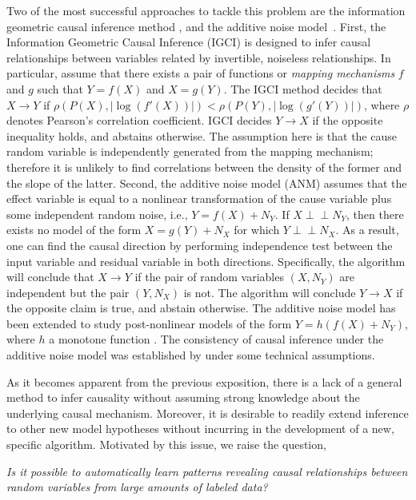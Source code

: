 \documentclass[twoside,11pt,a4paper]{article}
\newcommand\ci{\perp\!\!\!\perp}
\begin{document}
Two of the most successful approaches to tackle this problem are the
information geometric causal inference method \citep{Daniusis12,Janzing14}, and
the additive noise model~\citep{Hoyer09,Peters14:ANM}. 
%
First, the Information Geometric Causal Inference (IGCI) is designed to infer
causal relationships between variables related by invertible, noiseless
relationships.  In particular, assume that there exists a pair of functions or
\emph{mapping mechanisms} $f$ and $g$ such that $Y = f(X)$ and $X = g(Y)$. The
IGCI method decides that $X \rightarrow Y$ if $\rho(P(X),|\log(f'(X))|)< 
\rho(P(Y),|\log(g'(Y))|)$, where $\rho$ denotes Pearson's correlation coefficient.
IGCI decides $Y \rightarrow X$ if the opposite inequality holds, and abstains
otherwise.  The assumption here is that the cause random variable is
independently generated from the mapping mechanism; therefore it is unlikely to
find correlations between the density of the former and the slope of the latter. 
%
Second, the additive noise model (ANM) assumes that the effect variable is
equal to a nonlinear transformation of the cause variable plus some independent
random noise, i.e., $Y = f(X) + N_Y$. If $X\ci N_Y$,
then there exists no model of the form $X = g(Y) + N_X$ for which
$Y\ci N_X$. As a result, one can find the causal direction by
performing independence test between the input variable and residual
variable in both directions. Specifically,
the algorithm will conclude that $X \rightarrow Y$ if the pair of random variables
$(X, N_Y)$ are independent but the pair $(Y, N_X)$ is not. The algorithm will
conclude $Y \rightarrow X$ if the opposite claim is true, and abstain
otherwise. The additive noise model has been extended to study post-nonlinear
models of the form $Y = h(f(X)+N_Y)$, where $h$ a monotone function
\citep{Zhang09}. The consistency of causal inference under the additive noise
model was established by \citet{Kpotufe13} under some technical assumptions.

As it becomes apparent from the previous exposition, there is a lack of a
general method to infer causality without assuming strong knowledge about the
underlying causal mechanism.  Moreover, it is desirable to readily extend
inference to other new model hypotheses without incurring in the development of
a new, specific algorithm. Motivated by this issue, we raise the question,

\begin{center}
  \emph{Is it possible to automatically learn patterns revealing causal
  relationships between random variables from large amounts of labeled data?}
\end{center}
\end{document}
